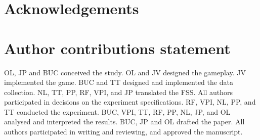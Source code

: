 \documentclass[a4paper,doc,floatsintext,natbib,10pt]{apa6}
\begin{document}



\section*{Acknowledgements}


\section*{Author contributions statement}
OL, JP and BUC conceived the study.
OL and JV designed the gameplay.
JV implemented the game.
BUC and TT designed and implemented the data collection.
NL, TT, PP, RF, VPI, and JP translated the FSS.
All authors participated in decisions on the experiment specifications.
RF, VPI, NL, PP, and TT conducted the experiment.
BUC, VPI, TT, RF, PP, NL, JP, and OL analysed and interpreted the results.
BUC, JP and OL drafted the paper.
All authors participated in writing and reviewing, and approved the manuscript.
\end{document}
